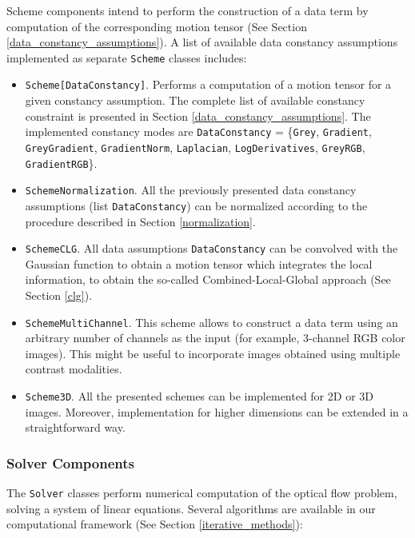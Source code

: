 Scheme components intend to perform the construction of a data term by computation of the corresponding motion tensor (See Section \ref{data_constancy_assumptions}).
A list of available data constancy assumptions implemented as separate \texttt{Scheme} classes includes:
\begin{itemize}
	\item \texttt{Scheme}\texttt{[DataConstancy]}. Performs a computation of a motion tensor for a given constancy assumption. The complete list of available constancy constraint is presented in Section \ref{data_constancy_assumptions}. The implemented constancy modes are \texttt{DataConstancy} = \{\texttt{Grey}, \texttt{Gradient}, \texttt{GreyGradient}, \texttt{GradientNorm}, \texttt{Laplacian}, \texttt{LogDerivatives}, \texttt{GreyRGB}, \texttt{GradientRGB}\}.
	  
	\item \texttt{SchemeNormalization}. All the previously presented data constancy assumptions (list \texttt{DataConstancy}) can be normalized according to the procedure described in Section \ref{normalization}.
	
	\item \texttt{SchemeCLG}. All data assumptions \texttt{DataConstancy} can be convolved with the Gaussian function to obtain a motion tensor which integrates the local information, to obtain the so-called Combined-Local-Global approach (See Section \ref{clg}).
	
	\item \texttt{SchemeMultiChannel}. This scheme allows to construct a data term using an arbitrary number of channels as the input (for example, 3-channel RGB color images). This might be useful to incorporate images obtained using multiple contrast modalities.
	
	\item \texttt{Scheme3D}. All the presented schemes can be implemented for 2D or 3D images. Moreover, implementation for higher dimensions can be extended in a straightforward way.
\end{itemize}


\subsubsection {Solver Components}

The \texttt{Solver} classes perform numerical computation of the optical flow problem, solving a system of  linear equations. Several algorithms are available in our computational  framework (See Section \ref{iterative_methods}): 

